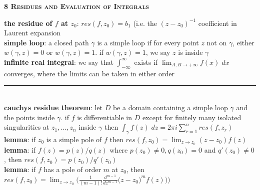 \documentclass[a4paper]{article}
\newcommand*\linesep[0]{\noindent\rule{\textwidth}{0.5pt}\\}
\begin{document}
\begin{framed}
	\begin{center}
		\textbf{\textsc{8 Residues and Evaluation of Integrals}}
	\end{center}
	\textbf{the residue of $f$ at $z_0$}: $res(f, z_0) = b_1$ (i.e. the $(z - z_0)^{-1}$ coefficient in Laurent expansion\\
	
	\noindent
	\textbf{simple loop}: a closed path $\gamma$ is a simple loop if for every point $z$ not on $\gamma$, either $w(\gamma, z) = 0$ or $w(\gamma, z) = 1$. if $w(\gamma, z) = 1$, we say $z$ is inside $\gamma$\\
	
	\noindent
	\textbf{infinite real integral}: we say that $\int_{-\infty}^\infty$ exists if $\lim_{A,B \rightarrow +\infty} f(x) \; dx$ converges, where the limits can be taken in either order
	
	\linesep
	
	\noindent
	\textbf{cauchys residue theorem}: let $D$ be a domain containing a simple loop $\gamma$ and the points inside $\gamma$. if $f$ is differentiable in $D$ except for finitely many isolated singularities at $z_1, \dots, z_n$ inside $\gamma$ then $\int_\gamma f(z) \; dz = 2 \pi i \sum_{r=1}^n res(f, z_r)$\\
	
	\noindent
	\textbf{lemma}: if $z_0$ is a simple pole of $f$ then $res(f, z_0) = \lim_{z \rightarrow z_0} (z-z_0)f(z)$\\
	
	\noindent
	\textbf{lemma}: if $f(z) = p(z) / q(z)$ where $p(z_0) \neq 0, q(z_0) = 0$ and $q'(z_0) \neq 0$, then $res(f, z_0) = p(z_0) / q'(z_0)$\\
	
	\noindent
	\textbf{lemma}: if $f$ has a pole of order $m$ at $z_0$, then $res(f, z_0) = \lim_{z \rightarrow z_0}\Big(\frac{1}{(m-1)!}\frac{d^{m-1}}{dz^{m-1}}\big(z-z_0)^mf(z)\big)\Big)$
\end{framed}
\end{document}
